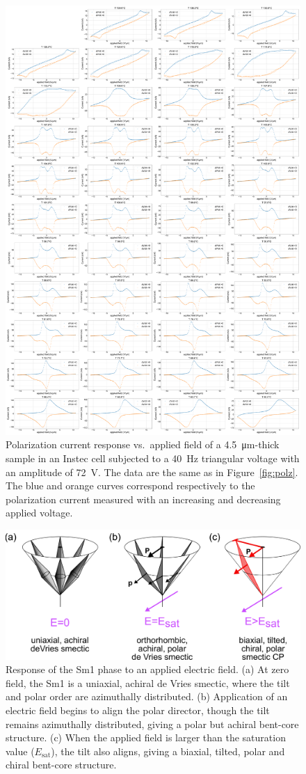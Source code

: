 \documentclass[superscriptaddress,floatfix,onecolumn,notitlepage]{revtex4-1}
\begin{document}
\begin{figure}[H]
    \centering
    \includegraphics[width=.85\textwidth]{montagevVsCForSupp.pdf}
    \caption{Polarization current response vs.\ applied field of a \SI{4.5}{\micro\metre}-thick  sample in an Instec cell subjected  to a \SI{40}{\hertz} triangular voltage with an amplitude of \SI{72}{\volt}. The data are the same as in Figure~\ref{fig:polz}.
    The blue and orange curves correspond respectively to the polarization current measured with an increasing and decreasing applied voltage.}
\end{figure}

\begin{figure}[H]
    \centering
    \includegraphics[width=.7\textwidth]{dvAlign.png}
    \caption{Response of the Sm1 phase to an applied electric field. (a) At zero
    field, the Sm1 is a uniaxial, achiral de Vries smectic, where the tilt and
    polar order are azimuthally distributed. (b) Application of an electric field
begins to align the polar director, though the tilt remains azimuthally
distributed, giving a polar but achiral bent-core structure. (c) When the
applied field is larger than the saturation value ($E_\text{sat}$), the tilt
also aligns, giving a biaxial, tilted, polar and chiral bent-core structure.}
\end{figure}


\end{document}
